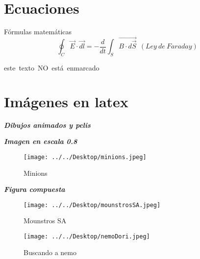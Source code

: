 \documentclass[10pt,a4paper]{book}
\begin{document}
\newpage
\section{Ecuaciones}


{\LARGE Fórmulas matemáticas \\}
\begin{equation} 
\oint_{C} \overrightarrow{E} \cdot \overrightarrow{dl} = - \frac{d}{dt} \int_{S} \overrightarrow{B \cdot d\overrightarrow{S}} \ \ (Ley\ de\ Faraday)
\end{equation}

\mbox{este texto NO está enmarcado}


\newpage
\section{Imágenes en latex}


\begin{center}
\textbf{{\Huge \textit{Dibujos animados y pelis \\}}}
\end{center}

\textbf{{\Large \textit{Imagen en escala 0.8}}}
\begin{figure}[htb]
\centering
\texttt{[image: ../../Desktop/minions.jpeg]} 
\caption{Minions}\label{fig:Virtual}
\end{figure}


\textbf{{\Large \textit{Figura compuesta}}}
\begin{figure}
\centering
\texttt{[image: ../../Desktop/mounstrosSA.jpeg]}
\caption{Mounstros SA}\label{fig:mounstros} 
\texttt{[image: ../../Desktop/nemoDori.jpeg]} 
\caption{Buscando a nemo}\label{fig:nemo}
\end{figure}

\end{document}
